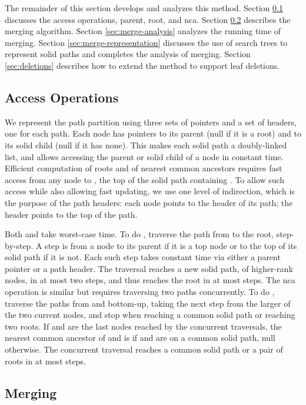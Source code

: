 \documentclass[twoside,leqno,twocolumn]{article}
\begin{document}
The remainder of this section develops and analyzes this method. Section \ref{sec:nca} discusses the access operations, parent, root, and nca. Section \ref{sec:merge} describes the merging algorithm. Section \ref{sec:merge-analysis} analyzes the running time of merging. Section \ref{sec:merge-representation} discusses the use of search trees to represent solid paths and completes the analysis of merging. Section \ref{sec:deletions} describes how to extend the method to support leaf deletions.


\subsection{Access Operations}
\label{sec:nca}

We represent the path partition using three sets of pointers and a set of headers, one for each path.  Each node has pointers to its parent (null if it is a root) and to its solid child (null if it has none).  This makes each solid path a doubly-linked list, and allows accessing the parent or solid child of a node in constant time.  Efficient computation of roots and of nearest common ancestors requires fast access from any node  to , the top of the solid path containing .  To allow such access while also allowing fast updating, we use one level of indirection, which is the purpose of the path headers:  each node points to the header of its path; the header points to the top of the path.

Both  and  take  worst-case time.  To do , traverse the path from  to the root, step-by-step.  A step is from a node to its parent if it is a top node or to the top of its solid path if it is not. Each such step takes constant time via either a parent pointer or a path header.  The traversal reaches a new solid path, of higher-rank nodes, in at most two steps, and thus reaches the root in at most  steps.  The nca operation is similar but requires traversing two paths concurrently.  To do , traverse the paths from  and  bottom-up, taking the next step from the larger of the two current nodes, and stop when reaching a common solid path or reaching two roots.  If  and  are the last nodes reached by the concurrent traversals, the nearest common ancestor of  and  is  if  and  are on a common solid path, null otherwise.  The concurrent traversal reaches a common solid path or a pair of roots in at most  steps.


\subsection{Merging}
\label{sec:merge}
\end{document}
